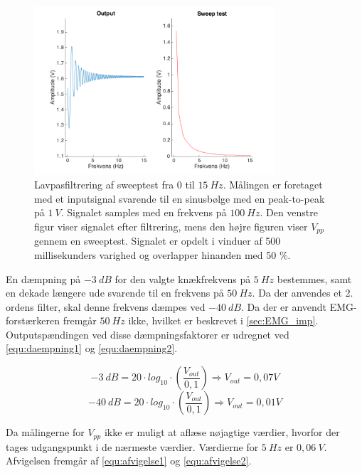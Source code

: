 \begin{figure}[H]
\centering
\includegraphics[width=0.8\textwidth]{figures/Lavpass_test}
\caption{Lavpasfiltrering af sweeptest fra 0 til $15~Hz$. Målingen er foretaget med et inputsignal svarende til en sinusbølge med en peak-to-peak på $1~V$. Signalet samples med en frekvens på $100~Hz$. Den venstre figur viser signalet efter filtrering, mens den højre figuren viser $V_{pp}$ gennem en sweeptest. Signalet er opdelt i vinduer af 500 millisekunders varighed og overlapper hinanden med 50 \%.}
\label{fig:lavps_sweep}
\end{figure}

\noindent
En dæmpning på $-3~dB$ for den valgte knækfrekvens på $5~Hz$ bestemmes, samt en dekade længere ude svarende til en frekvens på $50~Hz$. Da der anvendes et 2. ordens filter, skal denne frekvens dæmpes ved $-40~dB$. Da der er anvendt EMG-forstærkeren fremgår $50~Hz$ ikke, hvilket er beskrevet i \autoref{sec:EMG_imp}. Outputspændingen ved disse dæmpningsfaktorer er udregnet ved \autoref{equ:daempning1} og \autoref{equ:daempning2}. 

\begin{equation} \label{equ:daempning1}
-3~dB = 20 \cdot log_{10} \cdot (\frac{V_{out}}{0,1}) \Rightarrow V_{out} = 0,07 V
\end{equation}
\begin{equation} \label{equ:daempning2}
-40~dB = 20 \cdot log_{10} \cdot (\frac{V_{out}}{0,1}) \Rightarrow V_{out} = 0,01 V
\end{equation}

\noindent
Da målingerne for $V_{pp}$ ikke er muligt at aflæse nøjagtige værdier, hvorfor der tages udgangspunkt i de nærmeste værdier. Værdierne for $5~Hz$ er $0,06~V$. Afvigelsen fremgår af \autoref{equ:afvigelse1} og \autoref{equ:afvigelse2}.

